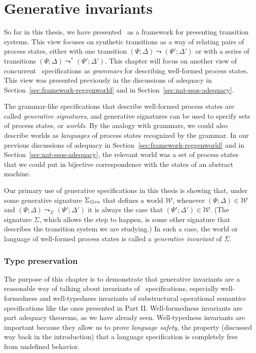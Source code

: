 \chapter{Generative invariants}
\label{chapter-gen}

So far in this thesis, we have presented \sls~as a framework for
presenting transition systems. This view focuses on synthetic
transitions as a way of relating pairs of process states, either with
one transition $(\Psi; \Delta) \leadsto (\Psi'; \Delta')$ or with a
series of transitions $(\Psi; \Delta) \leadsto^* (\Psi';
\Delta')$. This chapter will focus on another view of concurrent
\sls~specifications as {\it grammars} for describing well-formed
process states. This view was presented previously in the discussions
of adequacy in Section~\ref{sec:framework-reggenworld} and in
Section~\ref{sec:nat-ssos-adequacy}.

The grammar-like specifications that describe well-formed process
states are called {\it generative signatures}, and generative
signatures can be used to specify sets of process states, or {\it
  worlds}. By the analogy with grammars, we could also describe worlds
as {\it languages} of process states recognized by the grammar. In our
previous discussions of adequacy in
Section~\ref{sec:framework-reggenworld} and in
Section~\ref{sec:nat-ssos-adequacy}, the relevant world was a set of
process states that we could put in bijective correspondence with the
states of an abstract machine.

Our primary use of generative specifications in this thesis is showing
that, under some generative signature $\Sigma_{\it Gen}$ that defines
a world $\mathcal W$, whenever $(\Psi; \Delta) \in \mathcal W$ and
$(\Psi; \Delta) \leadsto_\Sigma (\Psi'; \Delta')$ it is always the
case that $(\Psi'; \Delta') \in \mathcal W$.  (The signature $\Sigma$,
which allows the step to happen, is some other signature that describes
the transition system we are studying.)  In such a case, the
world or language of well-formed process states is called a
{\it generative invariant} of $\Sigma$.

\subsection*{Type preservation}

The purpose of this chapter is to demonstrate that generative
invariants are a reasonable way of talking about invariants of
\sls~specifications, especially well-formedness and well-typedness
invariants of substructural operational semantics specifications like
the ones presented in Part II. Well-formedness invariants are part adequacy
theorems, as we have already
seen. Well-typedness invariants are important because they allow us to
prove {\it language safety}, the property (discussed way back in the
introduction) that a language specification is completely free
from undefined behavior.

